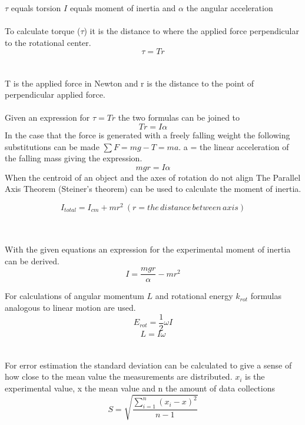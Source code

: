 \documentclass[11pt]{article}
\begin{document}
$\tau$ equals torsion $I$ equals moment of inertia and $\alpha$ the angular acceleration \\\\

To calculate torque ($\tau$) it is the distance to where the applied force perpendicular to the rotational center.  
\begin{equation}\tau=Tr\end{equation}
\parencite[171]{ph}\\\\
T is the applied force in Newton and r is the distance to the point of perpendicular applied force.\\\\ 
Given an expression for $\tau=Tr$ the two formulas can be joined to 
\begin{equation}Tr=I\alpha\end{equation}
In the case that the force is generated with a freely falling weight the following substitutions can be made $\sum F=mg-T=ma$.  
a = the linear acceleration of the falling mass giving the expression. 
\begin{equation}mgr=I\alpha\end{equation}
When the centroid of an object and the axes of rotation do not align The Parallel Axis Theorem (Steiner's theorem) can be used to calculate the moment of inertia.

\begin{equation}I_{total}=I_{cm}+mr^2\:(r=the\,distance\,between\,axis)\end{equation}
\parencite[181]{ph}
\\\\

With the given equations an expression for the experimental moment of inertia can be derived.
\begin{equation}
I=\frac{mgr}{\alpha}-mr^2
\label{finalderivation}
\end{equation}

For calculations of angular momentum $L$ and rotational energy $k_{rot}$  formulas analogous to linear motion are used. 
\begin{equation}
E_{rot}=\frac{1}{2}\omega I
\label{Erot}
\end{equation}
\begin{equation}
L=I\omega    
\label{L}
\end{equation}    
\parencite[181]{ph}
\\\\
For error estimation the standard deviation can be calculated to give a sense of how close to the mean value the measurements are distributed.
$x_i$ is the experimental value, x the mean value and n the amount of data collections 
\begin{equation} 
S=\sqrt{\frac{\sum_{i=1}^n (x_i-x)^2}{n-1}}
\label{deviat}
\end{equation}
\parencite[463]{ph}
\newpage
\end{document}
